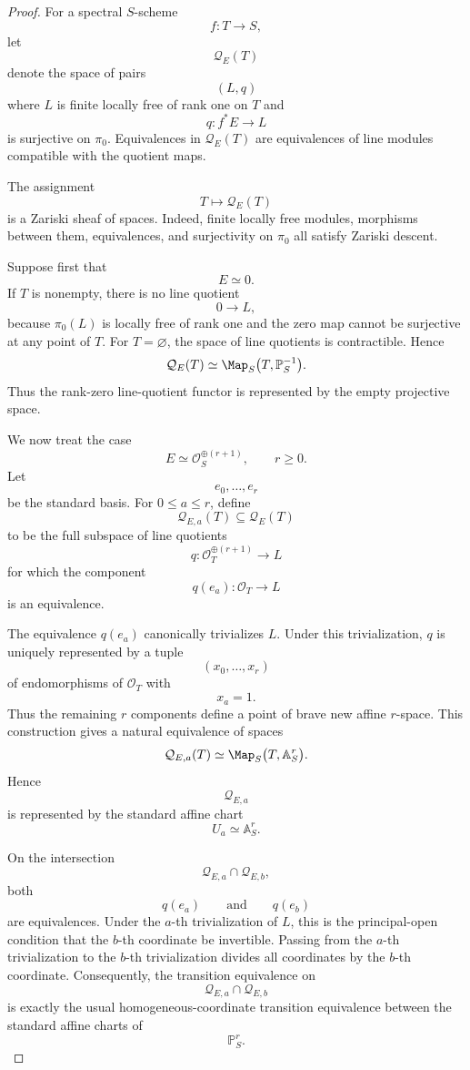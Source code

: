 \begin{proof}
For a spectral \(S\)-scheme
\[
    f:T\longrightarrow S,
\]
let
\[
    \mathcal Q_E(T)
\]
denote the space of pairs
\[
    (L,q)
\]
where \(L\) is finite locally free of rank one on \(T\) and
\[
    q:f^*E\longrightarrow L
\]
is surjective on \(\pi_0\).  Equivalences in \(\mathcal Q_E(T)\) are
equivalences of line modules compatible with the quotient maps.

The assignment
\[
    T\longmapsto\mathcal Q_E(T)
\]
is a Zariski sheaf of spaces.  Indeed, finite locally free modules, morphisms
between them, equivalences, and surjectivity on \(\pi_0\) all satisfy
Zariski descent.

Suppose first that
\[
    E\simeq0.
\]
If \(T\) is nonempty, there is no line quotient
\[
    0\longrightarrow L,
\]
because \(\pi_0(L)\) is locally free of rank one and the zero map cannot be
surjective at any point of \(T\).  For \(T=\varnothing\), the space of line
quotients is contractible.  Hence
\[
    \mathcal Q_E(T)
    \simeq
    \Map_S
    \bigl(
      T,
      \mathbb P^{-1}_S
    \bigr).
\]
Thus the rank-zero line-quotient functor is represented by the empty
projective space.

We now treat the case
\[
    E\simeq
    \mathcal O_S^{\oplus(r+1)},
    \qquad
    r\geq0.
\]
Let
\[
    e_0,\ldots,e_r
\]
be the standard basis.  For \(0\leq a\leq r\), define
\[
    \mathcal Q_{E,a}(T)
    \subseteq
    \mathcal Q_E(T)
\]
to be the full subspace of line quotients
\[
    q:
    \mathcal O_T^{\oplus(r+1)}
    \longrightarrow
    L
\]
for which the component
\[
    q(e_a):
    \mathcal O_T
    \longrightarrow
    L
\]
is an equivalence.

The equivalence \(q(e_a)\) canonically trivializes \(L\).  Under this
trivialization, \(q\) is uniquely represented by a tuple
\[
    (x_0,\ldots,x_r)
\]
of endomorphisms of \(\mathcal O_T\) with
\[
    x_a=1.
\]
Thus the remaining \(r\) components define a point of brave new affine
\(r\)-space.  This construction gives a natural equivalence of spaces
\[
    \mathcal Q_{E,a}(T)
    \simeq
    \Map_S
    \bigl(
      T,
      \mathbb A^r_S
    \bigr).
\]
Hence
\[
    \mathcal Q_{E,a}
\]
is represented by the standard affine chart
\[
    U_a\simeq\mathbb A^r_S.
\]

On the intersection
\[
    \mathcal Q_{E,a}\cap\mathcal Q_{E,b},
\]
both
\[
    q(e_a)
    \qquad\text{and}\qquad
    q(e_b)
\]
are equivalences.  Under the \(a\)-th trivialization of \(L\), this is the
principal-open condition that the \(b\)-th coordinate be invertible.  Passing
from the \(a\)-th trivialization to the \(b\)-th trivialization divides all
coordinates by the \(b\)-th coordinate.  Consequently, the transition
equivalence on
\[
    \mathcal Q_{E,a}\cap\mathcal Q_{E,b}
\]
is exactly the usual homogeneous-coordinate transition equivalence between
the standard affine charts of
\[
    \mathbb P^r_S.
\]


\end{proof}
